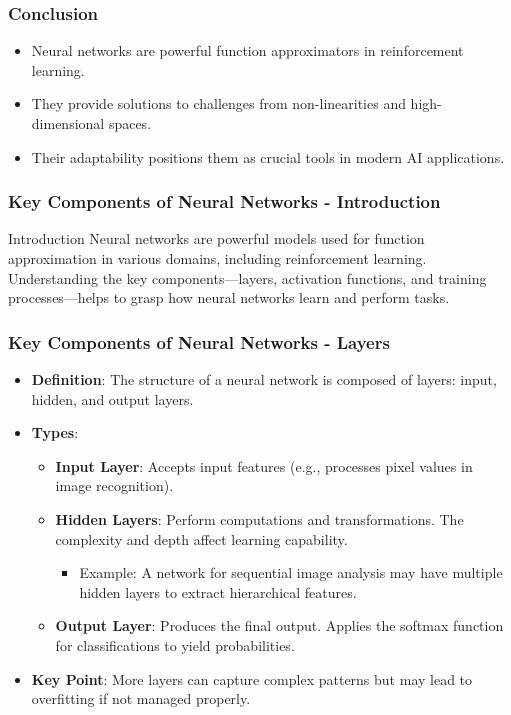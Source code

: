 \documentclass[aspectratio=169]{beamer}
\begin{document}
\begin{frame}[fragile]
    \frametitle{Conclusion}
    \begin{itemize}
        \item Neural networks are powerful function approximators in reinforcement learning.
        \item They provide solutions to challenges from non-linearities and high-dimensional spaces.
        \item Their adaptability positions them as crucial tools in modern AI applications.
    \end{itemize}
\end{frame}

\begin{frame}[fragile]
    \frametitle{Key Components of Neural Networks - Introduction}
    \begin{block}{Introduction}
        Neural networks are powerful models used for function approximation in various domains, including reinforcement learning. Understanding the key components—layers, activation functions, and training processes—helps to grasp how neural networks learn and perform tasks.
    \end{block}
\end{frame}

\begin{frame}[fragile]
    \frametitle{Key Components of Neural Networks - Layers}
    \begin{itemize}
        \item \textbf{Definition}: The structure of a neural network is composed of layers: input, hidden, and output layers.
        \item \textbf{Types}:
        \begin{itemize}
            \item \textbf{Input Layer}: Accepts input features (e.g., processes pixel values in image recognition).
            \item \textbf{Hidden Layers}: Perform computations and transformations. The complexity and depth affect learning capability.
                \begin{itemize}
                    \item Example: A network for sequential image analysis may have multiple hidden layers to extract hierarchical features.
                \end{itemize}
            \item \textbf{Output Layer}: Produces the final output. Applies the softmax function for classifications to yield probabilities.
        \end{itemize}
        \item \textbf{Key Point}: More layers can capture complex patterns but may lead to overfitting if not managed properly.
    \end{itemize}
\end{frame}
\end{document}
